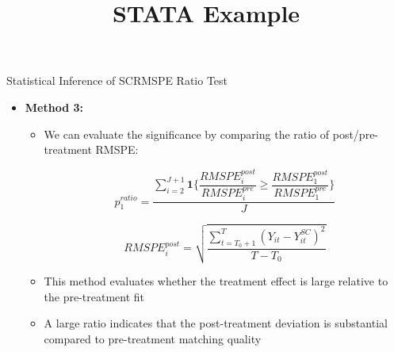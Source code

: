 \documentclass[hyperref={pdfpagelabels=false}]{beamer}
\begin{document}
\begin{frame}{Statistical Inference of SC}{RMSPE Ratio Test}
	\begin{itemize}
		\item \textbf{Method 3:}
		\vspace{0.2cm}
		\begin{itemize}
			\item We can evaluate the significance by comparing the ratio of post/pre-treatment RMSPE:
			
			\begin{equation*}
				p^{ratio}_{1}=\dfrac{\sum^{J+1}_{i=2}\mathbf{1}\{\dfrac{RMSPE^{post}_{i}}{RMSPE^{pre}_{i}} \geq \dfrac{RMSPE^{post}_{1}}{RMSPE^{pre}_{1}}\}}{J}
\end{equation*}
			
			\begin{equation*}
				RMSPE^{post}_{i}= \sqrt{\dfrac{\sum^{T}_{t=T_{0}+1}(Y_{it} - Y^{SC}_{it})^{2}}{T-T_{0}}}
\end{equation*}
			
			\item This method evaluates whether the treatment effect is large relative to the pre-treatment fit
					\vspace{0.2cm}
			\item A large ratio indicates that the post-treatment deviation is substantial compared to pre-treatment matching quality
		\end{itemize}
	\end{itemize}
\end{frame}

\title[]  
{STATA Example}


\author 
{}

\institute{}






\date
{}


\begin{frame}{}
	\titlepage
\end{frame}
\end{document}
